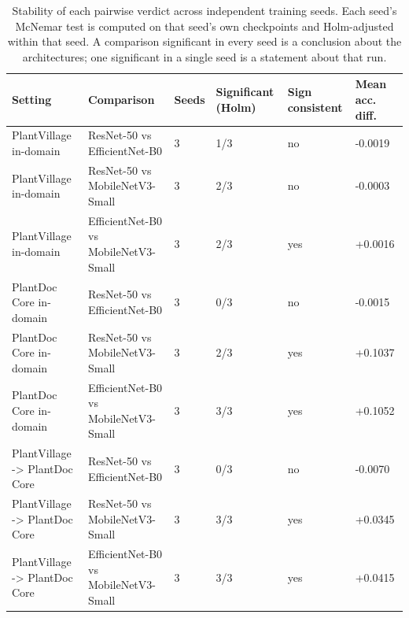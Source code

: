 \begin{table}[htbp]
\caption{Stability of each pairwise verdict across independent training seeds. Each seed's McNemar test is computed on that seed's own checkpoints and Holm-adjusted within that seed. A comparison significant in every seed is a conclusion about the architectures; one significant in a single seed is a statement about that run.}
\label{tab:significance-across-seeds}
\scriptsize
\centering
\begin{tabular}{llllll}
\toprule
Setting & Comparison & Seeds & Significant (Holm) & Sign consistent & Mean acc. diff. \\
\midrule
PlantVillage in-domain & ResNet-50 vs EfficientNet-B0 & 3 & 1/3 & no & -0.0019 \\
PlantVillage in-domain & ResNet-50 vs MobileNetV3-Small & 3 & 2/3 & no & -0.0003 \\
PlantVillage in-domain & EfficientNet-B0 vs MobileNetV3-Small & 3 & 2/3 & yes & +0.0016 \\
PlantDoc Core in-domain & ResNet-50 vs EfficientNet-B0 & 3 & 0/3 & no & -0.0015 \\
PlantDoc Core in-domain & ResNet-50 vs MobileNetV3-Small & 3 & 2/3 & yes & +0.1037 \\
PlantDoc Core in-domain & EfficientNet-B0 vs MobileNetV3-Small & 3 & 3/3 & yes & +0.1052 \\
PlantVillage -> PlantDoc Core & ResNet-50 vs EfficientNet-B0 & 3 & 0/3 & no & -0.0070 \\
PlantVillage -> PlantDoc Core & ResNet-50 vs MobileNetV3-Small & 3 & 3/3 & yes & +0.0345 \\
PlantVillage -> PlantDoc Core & EfficientNet-B0 vs MobileNetV3-Small & 3 & 3/3 & yes & +0.0415 \\
\bottomrule
\end{tabular}
\end{table}

